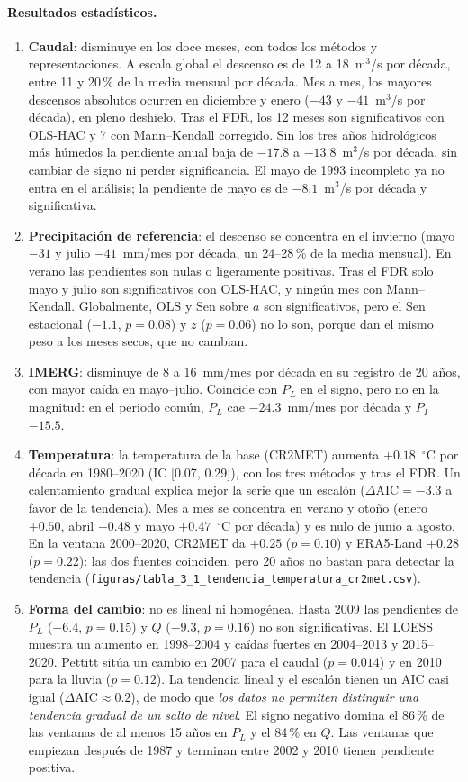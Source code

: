 \documentclass[11pt,a4paper]{article}
\newcommand{\archivo}[1]{\nolinkurl{#1}}
\newcommand{\PL}{P_L}
\newcommand{\PI}{P_I}
\newcommand{\Qm}{Q}
\begin{document}
\paragraph{Resultados estadísticos.}
\begin{enumerate}
\item \textbf{Caudal}: disminuye en los doce meses, con todos los métodos y representaciones. A escala global el descenso es de 12 a 18~m$^3$/s por década, entre 11 y 20\,\% de la media mensual por década. Mes a mes, los mayores descensos absolutos ocurren en diciembre y enero ($-43$ y $-41$~m$^3$/s por década), en pleno deshielo. Tras el FDR, los 12 meses son significativos con OLS-HAC y 7 con Mann--Kendall corregido. Sin los tres años hidrológicos más húmedos la pendiente anual baja de $-17.8$ a $-13.8$~m$^3$/s por década, sin cambiar de signo ni perder significancia. El mayo de 1993 incompleto ya no entra en el análisis; la pendiente de mayo es de $-8.1$~m$^3$/s por década y significativa.
\item \textbf{Precipitación de referencia}: el descenso se concentra en el invierno (mayo $-31$ y julio $-41$~mm/mes por década, un 24--28\,\% de la media mensual). En verano las pendientes son nulas o ligeramente positivas. Tras el FDR solo mayo y julio son significativos con OLS-HAC, y ningún mes con Mann--Kendall. Globalmente, OLS y Sen sobre $a$ son significativos, pero el Sen estacional ($-1.1$, $p=0.08$) y $z$ ($p=0.06$) no lo son, porque dan el mismo peso a los meses secos, que no cambian.
\item \textbf{IMERG}: disminuye de 8 a 16~mm/mes por década en su registro de 20 años, con mayor caída en mayo--julio. Coincide con $\PL$ en el signo, pero no en la magnitud: en el periodo común, $\PL$ cae $-24.3$~mm/mes por década y $\PI$ $-15.5$.
\item \textbf{Temperatura}: la temperatura de la base (CR2MET) aumenta $+0.18$~$^\circ$C por década en 1980--2020 (IC [0.07, 0.29]), con los tres métodos y tras el FDR. Un calentamiento gradual explica mejor la serie que un escalón ($\Delta\mathrm{AIC}=-3.3$ a favor de la tendencia). Mes a mes se concentra en verano y otoño (enero $+0.50$, abril $+0.48$ y mayo $+0.47$~$^\circ$C por década) y es nulo de junio a agosto. En la ventana 2000--2020, CR2MET da $+0.25$ ($p=0.10$) y ERA5-Land $+0.28$ ($p=0.22$): las dos fuentes coinciden, pero 20 años no bastan para detectar la tendencia (\archivo{figuras/tabla_3_1_tendencia_temperatura_cr2met.csv}).
\item \textbf{Forma del cambio}: no es lineal ni homogénea. Hasta 2009 las pendientes de $\PL$ ($-6.4$, $p=0.15$) y $\Qm$ ($-9.3$, $p=0.16$) no son significativas. El LOESS muestra un aumento en 1998--2004 y caídas fuertes en 2004--2013 y 2015--2020. Pettitt sitúa un cambio en 2007 para el caudal ($p=0.014$) y en 2010 para la lluvia ($p=0.12$). La tendencia lineal y el escalón tienen un AIC casi igual ($\Delta\mathrm{AIC}\approx0.2$), de modo que \emph{los datos no permiten distinguir una tendencia gradual de un salto de nivel}. El signo negativo domina el 86\,\% de las ventanas de al menos 15 años en $\PL$ y el 84\,\% en $\Qm$. Las ventanas que empiezan después de 1987 y terminan entre 2002 y 2010 tienen pendiente positiva.
\end{enumerate}
\end{document}
